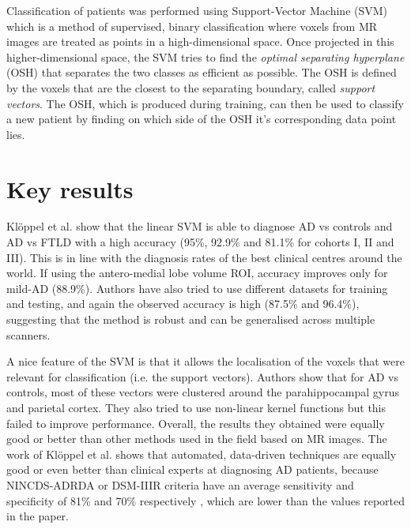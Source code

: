 \documentclass[11pt,a4paper,oneside]{report}
\begin{document}
Classification of patients was performed using Support-Vector Machine (SVM) which is a method of supervised, binary classification where voxels from MR images are treated as points in a high-dimensional space.  \cite{vapnik1998statistical,bishop2006pattern} Once projected in this higher-dimensional space, the SVM tries to find the \emph{optimal separating hyperplane} (OSH) that separates the two classes as efficient as possible. The OSH is defined by the voxels that are the closest to the separating boundary, called \emph{support vectors}. The OSH, which is produced during training, can then be used to classify a new patient by finding on which side of the OSH it's corresponding data point lies. 

\section*{Key results}

Kl\"{o}ppel et al. \cite{kloppel2008automatic} show that the linear SVM is able to diagnose AD vs controls and AD vs FTLD with a high accuracy (95\%, 92.9\% and 81.1\% for cohorts I, II and III). This is in line with the diagnosis rates of the best clinical centres around the world. \cite{knopman2001practice} If using the antero-medial lobe volume ROI, accuracy improves only for mild-AD (88.9\%). Authors have also tried to use different datasets for training and testing, and again the observed accuracy is high (87.5\% and 96.4\%), suggesting that the method is robust and can be generalised across multiple scanners. 

A nice feature of the SVM is that it allows the localisation of the voxels that were relevant for classification (i.e. the support vectors). Authors show that for AD vs controls, most of these vectors were clustered around the parahippocampal gyrus and parietal cortex. They also tried to use non-linear kernel functions but this failed to improve performance. Overall, the results they obtained were equally good or better than other methods used in the field based on MR images. \cite{gosche2002hippocampal,jack2002antemortem,barnes2004differentiating,csernansky2004correlations,wahlund2005evidence} The work of Kl\"{o}ppel et al. \cite{kloppel2008automatic} shows that automated, data-driven techniques are equally good or even better than clinical experts at diagnosing AD patients, because NINCDS-ADRDA or DSM-IIIR criteria have an average sensitivity and specificity of 81\% and 70\% respectively \cite{knopman2001practice}, which are lower than the values reported in the paper. 
\end{document}
